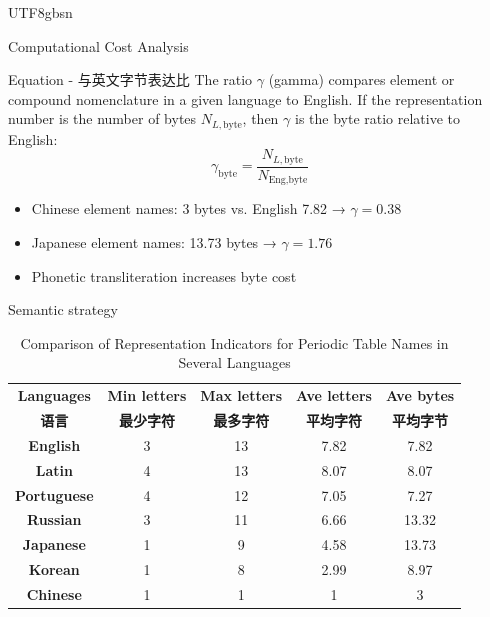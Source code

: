 \documentclass{beamer}
\begin{document}
\begin{CJK*}{UTF8}{gbsn}
\begin{frame}{Computational Cost Analysis}
\begin{block}{Equation - 与英文字节表达比}
The ratio $\gamma$ (gamma) compares element or compound nomenclature in a given language to English. If the representation number is the number of bytes $N_{L,\text{byte}}$, then $\gamma$ is the byte ratio relative to English:
\[
\gamma_\text{byte} = \frac{N_{L,\text{byte}}}{N_{\text{Eng},\text{byte}}}
\]
\end{block}
\begin{itemize}
    \item Chinese element names: 3 bytes vs. English 7.82 → $\gamma = 0.38$
    \item Japanese element names: 13.73 bytes → $\gamma = 1.76$
    \item Phonetic transliteration increases byte cost
\end{itemize}
\end{frame}

\begin{frame}{Semantic strategy}

\begin{table}%
\centering
\caption{Comparison of Representation Indicators for Periodic Table Names in Several Languages}
\begin{tabular}{ccccc}
\hline
\textbf{Languages} & \textbf{Min letters} & \textbf{Max letters} & \textbf{Ave letters} & \textbf{Ave bytes}  \\ 
\textbf{语言} & \textbf{最少字符} & \textbf{最多字符} & \textbf{平均字符} & \textbf{平均字节} \\ \hline
\textbf{English} & 3 & 13 & 7.82 & 7.82 \\ 
\textbf{Latin} & 4 & 13 & 8.07 & 8.07 \\ 
\textbf{Portuguese} & 4 & 12 & 7.05 & 7.27  \\ 
\textbf{Russian} & 3 & 11 & 6.66 & 13.32  \\ 
\textbf{Japanese} & 1 & 9 & 4.58 & 13.73  \\ 
\textbf{Korean} & 1 & 8 & 2.99 & 8.97  \\ 
\textbf{Chinese} & 1 & 1 & 1 & 3  \\ \hline
\end{tabular}
\label{tab:letter_byte_comparison}
\end{table}
\end{frame}


\end{CJK*}
\end{document}
